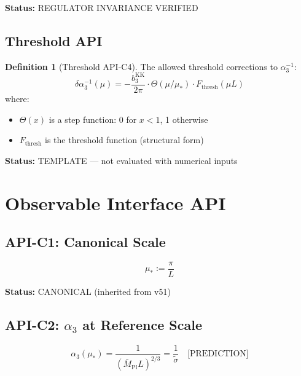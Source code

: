 \documentclass[11pt,a4paper]{article}
\theoremstyle{definition}
\newtheorem{definition}{Definition}[section]
\begin{document}
\textbf{Status:} REGULATOR INVARIANCE VERIFIED

\subsection{Threshold API}
\label{subsec:threshold-api}

\begin{definition}[Threshold API-C4]
The allowed threshold corrections to $\alpha_3^{-1}$:
\begin{equation}
\label{eq:threshold-api}
\delta\alpha_3^{-1}(\mu) = -\frac{b_3^{\text{KK}}}{2\pi} \cdot \Theta(\mu/\mu_*) \cdot F_{\text{thresh}}(\mu L)
\end{equation}
where:
\begin{itemize}
  \item $\Theta(x)$ is a step function: 0 for $x < 1$, 1 otherwise
  \item $F_{\text{thresh}}$ is the threshold function (structural form)
\end{itemize}
\end{definition}

\textbf{Status:} TEMPLATE --- not evaluated with numerical inputs

\section{Observable Interface API}
\label{sec:api}

\subsection{API-C1: Canonical Scale}
\label{subsec:api-c1}

\begin{equation}
\label{eq:api-c1}
\boxed{\mu_* := \frac{\pi}{L}}
\end{equation}

\textbf{Status:} CANONICAL (inherited from v51)

\subsection{API-C2: $\alpha_3$ at Reference Scale}
\label{subsec:api-c2}

\begin{equation}
\label{eq:api-c2}
\boxed{\alpha_3(\mu_*) = \frac{1}{(\bar{M}_{\text{Pl}} L)^{2/3}} = \frac{1}{\tilde{\sigma}}
  \quad \text{[PREDICTION]}}
\end{equation}
\end{document}
